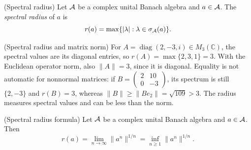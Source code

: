 \begin{cthdefinicion}{(Spectral radius)}
Let $\mathcal A$ be a complex unital Banach algebra and $a\in\mathcal A$.
The \emph{spectral radius} of $a$ is
\[
 r(a)=\max\{|\lambda|:\lambda\in\sigma_\mathcal A(a)\}.
\]
\end{cthdefinicion}

\begin{cthejemplo}{(Spectral radius and matrix norm)}
For $A=\operatorname{diag}(2,-3,i)\in M_3(\mathbb C)$,
the spectral values are its diagonal entries, so
$r(A)=\max\{2,3,1\}=3$. With the Euclidean operator norm, also
$\|A\|=3$, since it is diagonal. Equality is not automatic for
nonnormal matrices: if
$B=\begin{pmatrix}2&10\\0&-3\end{pmatrix}$,
its spectrum is still $\{2,-3\}$ and $r(B)=3$, whereas
$\|B\|\ge\|Be_2\|=\sqrt{109}>3$.
The radius measures spectral values and can be less than the norm.
\end{cthejemplo}

\begin{cthteorema}{(Spectral radius formula)}
Let $\mathcal A$ be a complex unital Banach algebra and $a\in\mathcal A$.
Then
\[
 r(a)=\lim_{n\to\infty}\|a^n\|^{1/n}
     =\inf_{n\ge1}\|a^n\|^{1/n}.
\]
\end{cthteorema}

